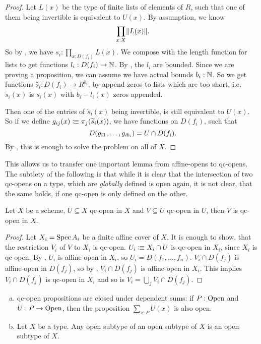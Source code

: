 \begin{proof}
  Let $L(x)$ be the type of finite lists of elements of $R$,
  such that one of them being invertible is equivalent to $U(x)$.
  By assumption, we know
  \[\prod_{x:X}\propTrunc{L(x)}\rlap{.}\]
  So by , we have $s_i:\prod_{x:D(f_i)}L(x)$.
  We compose with the length function for lists to get functions $l_i:D(f_i)\to\mathbb{N}$.
  By , the $l_i$ are bounded.
  Since we are proving a proposition, we can assume we have actual bounds $b_i:\mathbb{N}$.
  So we get functions $\tilde{s_i}:D(f_i)\to R^{b_i}$,
  by append zeros to lists which are too short,
  i.e. $\widetilde{s}_i(x)$ is $s_i(x)$ with $b_i-l_i(x)$ zeros appended.

  Then one of the entries of $\widetilde{s}_i(x)$ being invertible,
  is still equivalent to $U(x)$.
  So if we define $g_{ij}(x)\vcentcolon\mspace{-1.2mu}\equiv \pi_j(\widetilde{s}_i(x))$,
  we have functions on $D(f_i)$, such that
  \[
    D(g_{i1},\dots,g_{ib_i})=U\cap D(f_i)
    \rlap{.}
  \]
  By , this is enough to solve the problem on all of $X$.
\end{proof}

This allows us to transfer one important lemma from affine-opens to qc-opens.
The subtlety of the following is that while it is clear that the intersection of two
qc-opens on a type, which are \emph{globally} defined is open again, it is not clear,
that the same holds, if one qc-open is only defined on the other.

\begin{lemma}%
  \label{qc-open-trans}
  Let $X$ be a scheme, $U\subseteq X$ qc-open in $X$ and $V\subseteq U$ qc-open in $U$,
  then $V$ is qc-open in $X$.
\end{lemma}

\begin{proof}
  Let $X_i=\operatorname{Spec} A_i$ be a finite affine cover of $X$.
  It is enough to show, that the restriction $V_i$ of $V$ to $X_i$ is qc-open.
  $U_i\vcentcolon\mspace{-1.2mu}\equiv X_i\cap U$ is qc-open in $X_i$, since $X_i$ is qc-open.
  By , $U_i$ is affine-open in $X_i$,
  so $U_i=D(f_1,\dots,f_n)$.
  $V_i\cap D(f_j)$ is affine-open in $D(f_j)$, so by ,
  $V_i\cap D(f_j)$ is affine-open in $X_i$.
  This implies $V_i\cap D(f_j)$ is qc-open in $X_i$ and so is $V_i=\bigcup_{j}V_i\cap D(f_j)$.
\end{proof}

\begin{lemma}%
  \label{qc-open-sigma-closed}
  \begin{enumerate}[(a)]
  \item qc-open propositions are closed under dependent sums:
    if $P : \mathrm{Open}$ and $U : P \to \mathrm{Open}$,
    then the proposition $\sum_{x : P} U(x)$ is also open.
  \item Let $X$ be a type. Any open subtype of an open subtype of $X$ is an open subtype of $X$.
  \end{enumerate}
\end{lemma}

